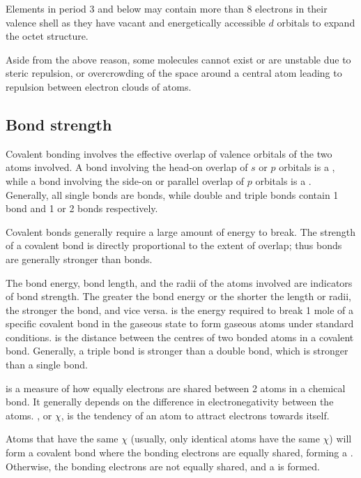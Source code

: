 \documentclass[Chemistry.tex]{subfiles}
\begin{document}
Elements in period 3 and below may contain more than 8 electrons in their valence shell as they have vacant and energetically accessible \(d\) orbitals to expand the octet structure.

Aside from the above reason, some molecules cannot exist or are unstable due to steric repulsion, or overcrowding of the space around a central atom leading to repulsion between electron clouds of atoms.
\subsection{Bond strength}
Covalent bonding involves the effective overlap of valence orbitals of the two atoms involved. A bond involving the head-on overlap of \(s\) or \(p\) orbitals is a , while a bond involving the side-on or parallel overlap of \(p\) orbitals is a . Generally, all single bonds are \mupsigma{} bonds, while double and triple bonds contain 1 \mupsigma{} bond and 1 or 2 \muppi{} bonds respectively.

Covalent bonds generally require a large amount of energy to break. The strength of a covalent bond is directly proportional to the extent of overlap; thus \mupsigma bonds are generally stronger than \muppi{} bonds.

The bond energy, bond length, and the radii of the atoms involved are indicators of bond strength. The greater the bond energy or the shorter the length or radii, the stronger the bond, and vice versa.  is the energy required to break 1 mole of a specific covalent bond in the gaseous state to form gaseous atoms under standard conditions.  is the distance between the centres of two bonded atoms in a covalent bond. Generally, a triple bond is stronger than a double bond, which is stronger than a single bond.

 is a measure of how equally electrons are shared between 2 atoms in a chemical bond. It generally depends on the difference in electronegativity between the atoms. , or \(\chi\), is the tendency of an atom to attract electrons towards itself.

Atoms that have the same \(\chi\) (usually, only identical atoms have the same \(\chi\)) will form a covalent bond where the bonding electrons are equally shared, forming a . Otherwise, the bonding electrons are not equally shared, and a  is formed.
\end{document}
